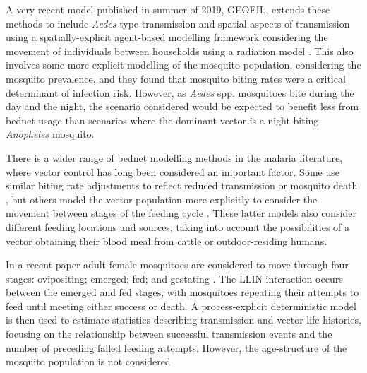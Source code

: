 A very recent model published in summer of 2019, GEOFIL, extends these methods to include \textit{Aedes}-type transmission and spatial aspects of transmission using a spatially-explicit agent-based modelling framework considering the movement of individuals between households using a radiation model \cite{Xu2019}. This also involves some more explicit modelling of the mosquito population, considering the mosquito prevalence, and they found that mosquito biting rates were a critical determinant of infection risk. However, as \textit{Aedes} spp. mosquitoes bite during the day and the night, the scenario considered would be expected to benefit less from bednet usage than scenarios where the dominant vector is a night-biting \textit{Anopheles} mosquito.

There is a wider range of bednet modelling methods in the malaria literature, where vector control has long been considered an important factor. Some use similar biting rate adjustments to reflect reduced transmission or mosquito death \cite{griffin2010}, but others model the vector population more explicitly to consider the movement between stages of the feeding cycle \cite{killeen2016,le2007}. These latter models also consider different feeding locations and sources, taking into account the possibilities of a vector obtaining their blood meal from cattle or outdoor-residing humans.

In a recent paper adult female mosquitoes are considered to move through four stages: ovipositing; emerged; fed; and gestating \cite{killeen2016}. The LLIN interaction occurs between the emerged and fed stages, with mosquitoes repeating their attempts to feed until meeting either success or death. A process-explicit deterministic model is then used to estimate statistics describing transmission and vector life-histories, focusing on the relationship between successful transmission events and the number of preceding failed feeding attempts. However, the age-structure of the mosquito population is not considered


